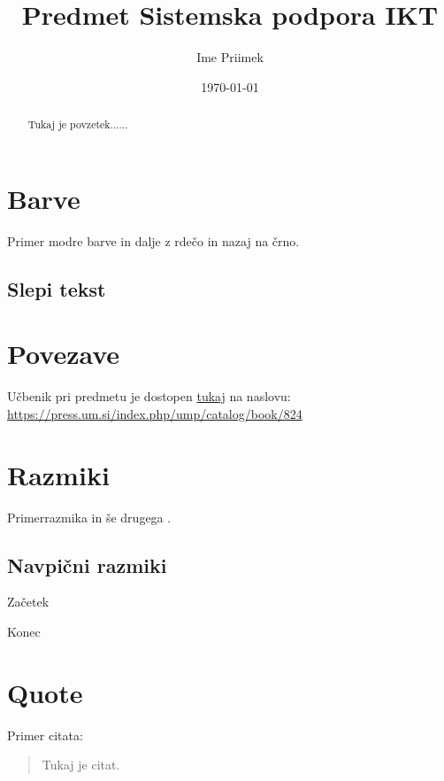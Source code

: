 \documentclass[a4paper,12pt]{article}
\title{Predmet Sistemska podpora IKT}
\date{\today}
\author{Ime Priimek}
\begin{document}
\maketitle

\begin{abstract}
Tukaj je povzetek......
\end{abstract}

\tableofcontents

\section{Barve}

\color{blue}Primer modre barve \color{red} in dalje z rde\v{c}o \color{black} in nazaj na \v{c}rno.

\subsection{Slepi tekst}

\section{Povezave}

Učbenik pri predmetu je dostopen \href{https://press.um.si/index.php/ump/catalog/book/824}{tukaj} 
na naslovu: \url{https://press.um.si/index.php/ump/catalog/book/824}

\section{Razmiki}

Primer\hspace{2cm}razmika in še drugega \hspace{3.5cm}.

\subsection{Navpični razmiki}

Začetek

\vspace{4cm}

Konec

\section{Quote}

Primer citata:

\begin{quote}
Tukaj je citat.
\end{quote}
\end{document}
